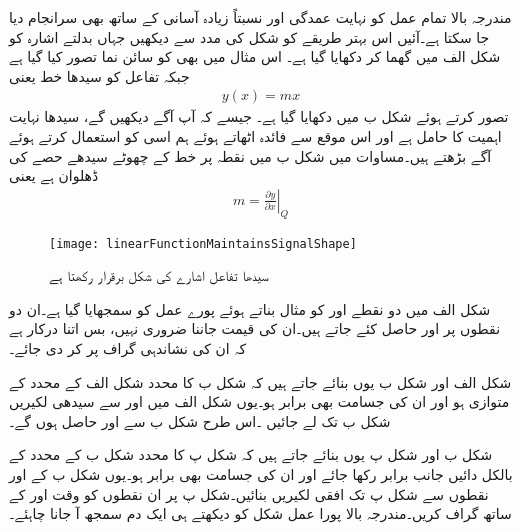 مندرجہ بالا تمام عمل کو نہایت عمدگی اور نسبتاً زیادہ آسانی کے ساتھ بھی سرانجام دیا جا سکتا ہے۔آئیں اس بہتر طریقے کو شکل   کی مدد سے دیکھیں جہاں بدلتے اشارہ  کو شکل  الف میں گھما کر دکھایا گیا ہے۔ اس مثال میں بھی   کو سائن نما تصور کیا گیا ہے جبکہ  تفاعل  کو سیدھا خط یعنی
\begin{align} \label{مساوات_محور_سے_گزرتا_سیدھا_خط}
y(x)= m x
\end{align}
تصور کرتے ہوئے شکل  ب میں دکھایا گیا ہے۔ جیسے کہ آپ آگے دیکھیں گے، سیدھا  نہایت اہمیت کا حامل ہے اور اس موقع سے فائدہ اٹھاتے ہوئے ہم اسی کو استعمال کرتے ہوئے آگے بڑھتے ہیں۔مساوات    میں  شکل  ب میں نقطہ  پر خط کے چھوٹے سیدھے حصے کی ڈھلوان ہے یعنی 
\begin{align} \label{مساوات_ڈایوڈ_سیدھے_خط_کی_ڈھلوان_الف}
m=\left . \frac{\partial y}{\partial x} \right|_Q
\end{align}
%
\begin{figure}
\centering
\texttt{[image: linearFunctionMaintainsSignalShape]}
\caption{سیدھا تفاعل اشارے کی شکل برقرار رکھتا ہے }
\label{شکل_سیدھا_تفاعل_شکل_برقرار}
\end{figure}
شکل  الف میں دو نقطے  اور   کو مثال بناتے ہوئے پورے عمل کو سمجھایا گیا ہے۔ان دو نقطوں پر  اور  حاصل کئے جاتے ہیں۔ان کی قیمت جاننا ضروری نہیں، بس اتنا درکار ہے کہ ان کی نشاندہی گراف پر کر دی جائے۔

شکل  الف اور شکل  ب یوں بنائے جاتے ہیں کہ شکل  ب کا  محدد شکل  الف کے  محدد کے متوازی ہو اور ان کی جسامت بھی برابر ہو۔یوں شکل  الف میں  اور  سے سیدھی لکیریں شکل  ب تک لے جائیں ۔اس طرح شکل  ب سے  اور حاصل ہوں گے۔

شکل  ب اور شکل  پ یوں بنائے جاتے ہیں کہ شکل  پ کا  محدد شکل  ب کے  محدد کے بالکل دائیں جانب برابر رکھا جائے اور ان کی جسامت بھی برابر ہو۔یوں شکل  ب کے  اور  نقطوں سے شکل  پ تک افقی لکیریں بنائیں۔شکل  پ پر ان نقطوں کو وقت  اور  کے ساتھ گراف کریں۔مندرجہ بالا پورا عمل شکل    کو دیکھتے ہی ایک دم سمجھ آ جانا چاہئے۔

